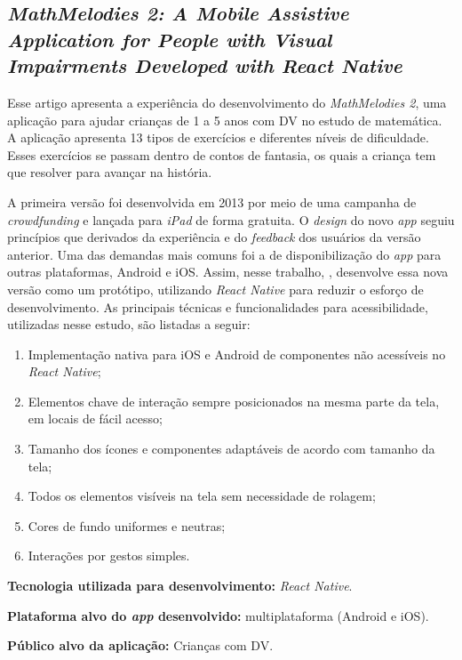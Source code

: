 \subsection{\emph{MathMelodies 2: A Mobile Assistive Application for People with Visual Impairments Developed with React Native}}

Esse artigo apresenta a experiência do desenvolvimento do \emph{MathMelodies 2}, uma aplicação para ajudar crianças de 1 a 5 anos com DV no estudo de matemática.
A aplicação apresenta 13 tipos de exercícios e diferentes níveis de dificuldade.
Esses exercícios se passam dentro de contos de fantasia, os quais a criança tem que resolver para avançar na história.

A primeira versão foi desenvolvida em 2013 por meio de uma campanha de \emph{crowdfunding} e lançada para \emph{iPad} de forma gratuita.
O \emph{design} do novo \emph{app} seguiu princípios que derivados da experiência e do \emph{feedback} dos usuários da versão anterior.
Uma das demandas mais comuns foi a de disponibilização do \emph{app} para outras plataformas, Android e iOS.
Assim, nesse trabalho, , desenvolve essa nova versão como um protótipo, utilizando \emph{React Native} para reduzir o esforço de desenvolvimento.
As principais técnicas e funcionalidades para acessibilidade, utilizadas nesse estudo, são listadas a seguir:

\begin{enumerate}
    \item Implementação nativa para iOS e Android de componentes não acessíveis no \emph{React Native};
    \item Elementos chave de interação sempre posicionados na mesma parte da tela, em locais de fácil acesso;
    \item Tamanho dos ícones e componentes adaptáveis de acordo com tamanho da tela;
    \item Todos os elementos visíveis na tela sem necessidade de rolagem;
    \item Cores de fundo uniformes e neutras;
    \item Interações por gestos simples.
\end{enumerate}

\textbf{Tecnologia utilizada para desenvolvimento:} \emph{React Native}.

\textbf{Plataforma alvo do \emph{app} desenvolvido:} multiplataforma (Android e iOS).

\textbf{Público alvo da aplicação:} Crianças com DV\@.


